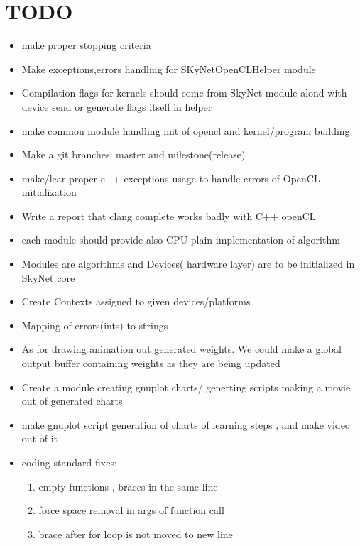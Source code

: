 \documentclass[a4paper,10pt]{article}
\begin{document}
\section{TODO}
\begin{itemize}
\item make proper stopping criteria
\item Make exceptions,errors handling for SKyNetOpenCLHelper module
\item Compilation flags for kernels should come from SkyNet module alond with device send or generate flags itself in helper
\item make common module handling init of opencl and kernel/program building
\item Make a git branches: master and milestone(release)
\item make/lear proper c++ exceptions usage to handle errors of OpenCL initialization
\item Write a report that clang complete works badly with C++ openCL
\item each module should provide also CPU plain implementation of algorithm
\item Modules are algorithms and Devices( hardware layer) are to be initialized in SkyNet core
\item Create Contexts assigned to given devices/platforms
\item Mapping of errors(ints) to strings
\item As for drawing animation out generated weights. We could make a global output buffer
containing weights as they are being updated
\item Create a module creating gnuplot charts/ generting scripts making a movie out of generated charts
\item make gnuplot script generation of charts of learning steps , and make video out of it
\item coding standard fixes:
\begin{enumerate}
\item empty functions , braces in the same line
\item force space removal in args of function call
\item brace after for loop is not moved to new line
\end{enumerate}
\end{itemize}
\end{document}
